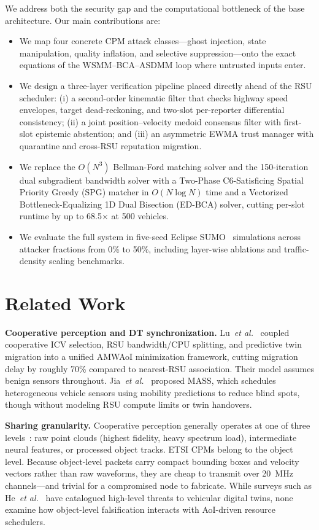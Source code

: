 \documentclass[conference]{IEEEtran}
\begin{document}
We address both the security gap and the computational bottleneck of the base architecture. Our main contributions are:
\begin{itemize}
\item We map four concrete CPM attack classes---ghost injection, state manipulation, quality inflation, and selective suppression---onto the exact equations of the WSMM--BCA--ASDMM loop where untrusted inputs enter.
\item We design a three-layer verification pipeline placed directly ahead of the RSU scheduler: (i) a second-order kinematic filter that checks highway speed envelopes, target dead-reckoning, and two-slot per-reporter differential consistency; (ii) a joint position--velocity medoid consensus filter with first-slot epistemic abstention; and (iii) an asymmetric EWMA trust manager with quarantine and cross-RSU reputation migration.
\item We replace the $O(N^3)$ Bellman-Ford matching solver and the 150-iteration dual subgradient bandwidth solver with a Two-Phase C6-Satisficing Spatial Priority Greedy (SPG) matcher in $O(N\log N)$ time and a Vectorized Bottleneck-Equalizing 1D Dual Bisection (ED-BCA) solver, cutting per-slot runtime by up to 68.5$\times$ at 500 vehicles.
\item We evaluate the full system in five-seed Eclipse SUMO~\cite{sumo} simulations across attacker fractions from 0\% to 50\%, including layer-wise ablations and traffic-density scaling benchmarks.
\end{itemize}

\section{Related Work}
\textbf{Cooperative perception and DT synchronization.} Lu~\textit{et al.}~\cite{lu2025} coupled cooperative ICV selection, RSU bandwidth/CPU splitting, and predictive twin migration into a unified AMWAoI minimization framework, cutting migration delay by roughly 70\% compared to nearest-RSU association. Their model assumes benign sensors throughout. Jia~\textit{et al.}~\cite{jia2023} proposed MASS, which schedules heterogeneous vehicle sensors using mobility predictions to reduce blind spots, though without modeling RSU compute limits or twin handovers.

\textbf{Sharing granularity.} Cooperative perception generally operates at one of three levels~\cite{lu2025}: raw point clouds (highest fidelity, heavy spectrum load), intermediate neural features, or processed object tracks. ETSI CPMs belong to the object level. Because object-level packets carry compact bounding boxes and velocity vectors rather than raw waveforms, they are cheap to transmit over 20~MHz channels---and trivial for a compromised node to fabricate. While surveys such as He~\textit{et al.}~\cite{he2023} have catalogued high-level threats to vehicular digital twins, none examine how object-level falsification interacts with AoI-driven resource schedulers.
\end{document}
